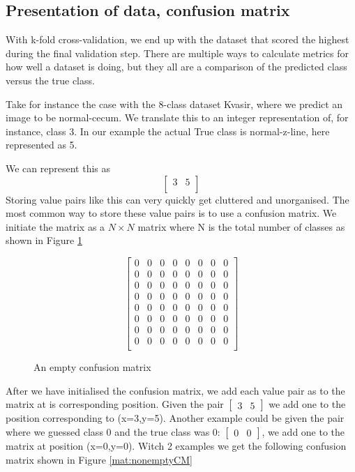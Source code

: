 \subsection{Presentation of data, confusion matrix}
With k-fold cross-validation, we end up with the dataset that scored the highest during the final validation step.  There are multiple ways to calculate metrics for how well a dataset is doing,  but they all are a comparison of the predicted class versus the true class.  

Take for instance the case with the 8-class dataset Kvasir, where we predict an image to be normal-cecum. We translate this to an integer representation of, for instance, class 3. In our example the actual True class is normal-z-line, here represented as 5. 

We can represent this as 
\[
\begin{bmatrix}
 3 & 5\\ 
\end{bmatrix}
\]
Storing value pairs like this can very quickly get cluttered and unorganised.
The most common way to store these value pairs is to use a confusion matrix.  We initiate the matrix as a \textit{$N \times N$} matrix where N is the total number of classes as shown in Figure \ref{mat:emptyCM}

\begin{figure}
    \centering
    \[
    \begin{bmatrix}
     0 & 0 &  0 &  0 &  0 &  0 &  0 &  0\\
     0 & 0 &  0 &  0 &  0 &  0 &  0 &  0\\
     0 & 0 &  0 &  0 &  0 &  0 &  0 &  0\\
     0 & 0 &  0 &  0 &  0 &  0 &  0 &  0\\
     0 & 0 &  0 &  0 &  0 &  0 &  0 &  0\\
     0 & 0 &  0 &  0 &  0 &  0 &  0 &  0\\
     0 & 0 &  0 &  0 &  0 &  0 &  0 &  0\\
     0 & 0 &  0 &  0 &  0 &  0 &  0 &  0\\
    \end{bmatrix}
    \]
    \caption{An empty confusion matrix}
    \label{mat:emptyCM}
\end{figure}



After we have initialised the confusion matrix, we add each value pair as to the matrix at is corresponding position.  
Given the pair $\begin{bmatrix} 3 & 5 \end{bmatrix}$ we add one to the position corresponding to (x=3,y=5). 
 Another example could be given the pair where we guessed class 0 and the true class was 0:  $\begin{bmatrix}  0 & 0 \end{bmatrix}$, we add one to the matrix at position (x=0,y=0). Witch 2 examples we get the following confusion matrix shown in Figure \ref{mat:nonemptyCM}

